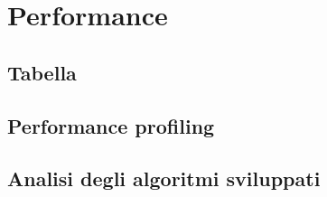 \chapter{Performance}
\section{Tabella}
\section{Performance profiling}
\section{Analisi degli algoritmi sviluppati}
